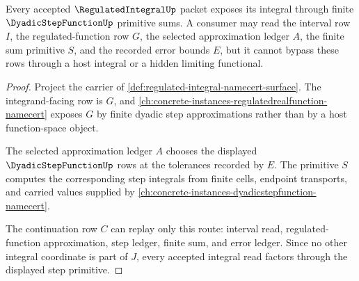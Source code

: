\begin{theorem}
\label{thm:regulated-integral-step-primitive}
Every accepted $\RegulatedIntegralUp$ packet exposes its integral through finite $\DyadicStepFunctionUp$ primitive sums. A consumer may read the interval row $I$, the regulated-function row $G$, the selected approximation ledger $A$, the finite sum primitive $S$, and the recorded error bounds $E$, but it cannot bypass these rows through a host integral or a hidden limiting functional.
\end{theorem}
\begin{proof}
Project the carrier of \autoref{def:regulated-integral-namecert-surface}. The integrand-facing row is $G$, and \autoref{ch:concrete-instances-regulatedrealfunction-namecert} exposes $G$ by finite dyadic step approximations rather than by a host function-space object.

The selected approximation ledger $A$ chooses the displayed $\DyadicStepFunctionUp$ rows at the tolerances recorded by $E$. The primitive $S$ computes the corresponding step integrals from finite cells, endpoint transports, and carried values supplied by \autoref{ch:concrete-instances-dyadicstepfunction-namecert}.

The continuation row $C$ can replay only this route: interval read, regulated-function approximation, step ledger, finite sum, and error ledger. Since no other integral coordinate is part of $J$, every accepted integral read factors through the displayed step primitive.
\end{proof}

